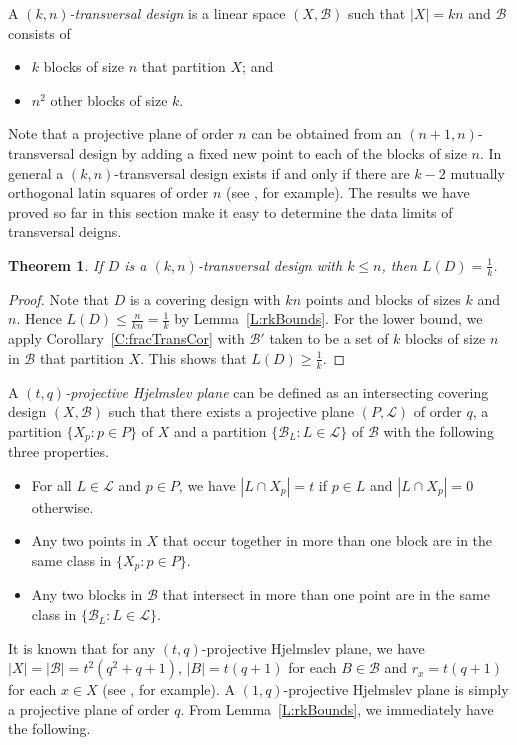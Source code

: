 \documentclass[11pt]{article}
\newtheorem{Theorem}{Theorem}[section]
\theoremstyle{definition}
\renewcommand{\leq}{\leqslant}
\renewcommand{\geq}{\geqslant}
\newcommand{\B}{{\ensuremath{\mathcal{B}}}}
\begin{document}
A \emph{$(k,n)$-transversal design} is a linear space $(X,\B)$ such that $|X| = kn$ and $\B$ consists of
\begin{itemize}[itemsep=0mm]
\item $k$ blocks of size $n$ that partition $X$; and
\item $n^2$ other blocks of size $k$.
\end{itemize}
Note that a projective plane of order $n$ can be obtained from an $(n+1,n)$-transversal design by adding a fixed new point to each of the blocks of size $n$. In general a $(k,n)$-transversal design exists if and only if there are $k-2$ mutually orthogonal latin squares of order $n$ (see \cite[\S6.6]{Sti}, for example). The results we have proved so far in this section make it easy to determine the data limits of transversal deigns.

\begin{Theorem}\label{T:transversal}
If $D$ is a $(k,n)$-transversal design with $k \leq n$, then $L(D) = \frac{1}{k}$.
\end{Theorem}

\begin{proof}
Note that $D$ is a covering design with $kn$ points and blocks of sizes $k$ and $n$. Hence $L(D) \leq \frac{n}{kn} = \frac{1}{k}$ by Lemma~\ref{L:rkBounds}. For the lower bound, we apply Corollary~\ref{C:fracTransCor} with $\B'$ taken to be a set of $k$ blocks of size $n$ in $\B$ that partition $X$. This shows that $L(D) \geq \frac{1}{k}$.
\end{proof}


A \emph{$(t,q)$-projective Hjelmslev  plane} can be defined as an intersecting covering design $(X,\B)$ such that there exists a projective plane $(P,\mathcal{L})$ of order $q$, a partition $\{X_p:p \in P\}$ of $X$ and a partition $\{\B_L:L \in \mathcal{L}\}$ of $\B$ with the following three properties.\pagebreak
\begin{itemize}[itemsep=0mm]
\item For all $L \in \mathcal{L}$ and $p \in P$, we have $|L \cap X_p|=t$ if $p \in L$ and $|L \cap X_p|=0$ otherwise.
\item Any two points in $X$ that occur together in more than one block are in the same class in $\{X_p:p \in P\}$.
\item Any two blocks in $\B$ that intersect in more than one point are in the same class in $\{\B_L:L \in \mathcal{L}\}$.
\end{itemize}
It is known that for any $(t,q)$-projective Hjelmslev plane, we have $|X|=|\B|=t^2(q^2+q+1)$, $|B|=t(q+1)$ for each $B \in \B$ and $r_x=t(q+1)$ for each $x \in X$ (see \cite{Dra}, for example). A $(1,q)$-projective Hjelmslev plane is simply a projective plane of order $q$. From Lemma~\ref{L:rkBounds}, we immediately have the following.
\end{document}
